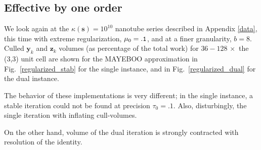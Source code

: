 \documentclass[letterpaper,twocolumn,amsmath,amsfont,amssymb,english,aps,jcp,preprintnumbers,groupaddress,nofootinbib,tightenlines,floatfix]{revtex4}
\newcommand{\mat}[1]{\boldsymbol{#1}}
\theoremstyle{plain}
\theoremstyle{remark}
\theoremstyle{plain}
\begin{document}
\subsection{Effective by one order}

We look again at the $\kappa(\mat{s})=10^{10}$ nanotube series described in Appendix \ref{data},
this time with extreme regularization, $\mu_0={\tt .1}$, and at a finer granularity, $b=8$.
Culled $\mat{y}_k$ and $\mat{z}_k$ volumes (as percentage of the total work) for $36 - 128 \, \times$ the (3,3) unit cell
are shown for the MAYEBOO approximation in Fig.~\ref{regularized_stab} for the single instance, 
and in Fig.~\ref{regularized_dual} for the dual instance. 

The behavior of these implementations  is very different; in the single 
instance, a stable  iteration could not be found at precision $\tau_0=.1$.  
Also, disturbingly, the single iteration with inflating cull-volumes. 


On the other hand, volume of the dual iteration 
is strongly contracted with resolution of the identity.  
\end{document}
